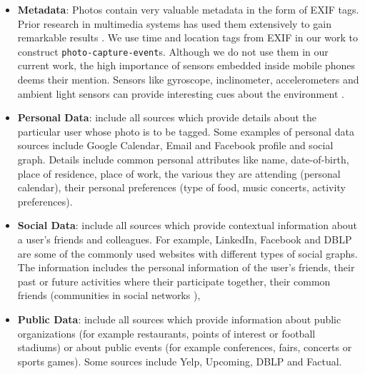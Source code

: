 \begin{itemize}
\item \textbf{Metadata}: Photos contain very valuable metadata in the form of EXIF tags. Prior research in multimedia systems has used them extensively to gain remarkable results \cite{boutell2004photo, sinha2008concept}. We use time and location tags from EXIF in our work to construct \texttt{photo-capture-event}s. Although we do not use them in our current work, the high importance of sensors embedded inside mobile phones deems their mention. Sensors like gyroscope, inclinometer, accelerometers and ambient light sensors can provide interesting cues about the environment \cite{patterson2005assisted, siewiorek2003sensay}.

\item \textbf{Personal Data}: include all sources which provide details about the particular user whose photo is to be tagged. Some examples of personal data sources include Google Calendar, Email and Facebook profile and social graph. Details include common personal attributes like name, date-of-birth, place of residence, place of work, the various they are attending (personal calendar), their personal preferences (type of food, music concerts, activity preferences).

\item \textbf{Social Data}: include all sources which provide contextual information about a user's friends and colleagues. For example, LinkedIn, Facebook and DBLP are some of the commonly used websites with different types of social graphs. The information includes the personal information of the user's friends, their past or future activities where their participate together, their common friends (communities in social networks \cite{backstrom2006group, krawczyk2009communities}), 

\item \textbf{Public Data}: include all sources which provide information about public organizations (for example restaurants, points of interest or football stadiums) or about public events (for example conferences, fairs, concerts or sports games). Some sources include Yelp, Upcoming, DBLP and Factual.
\end{itemize}


